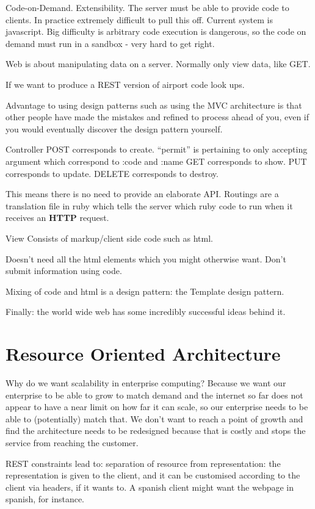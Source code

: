 \documentclass[11pt]{article}
\begin{document}
Code-on-Demand. Extensibility. The server must be able to provide code to clients. In practice extremely difficult to pull this off. Current system is javascript. Big difficulty is arbitrary code execution is dangerous, so the code on demand must run in a sandbox - very hard to get right.

Web is about manipulating data on a server. Normally only view data, like GET.

If we want to produce a REST version of airport code look ups.

Advantage to using design patterns such as using the MVC architecture is that other people have made the mistakes and refined to process ahead of you, even if you would eventually discover the design pattern yourself.

Controller
POST corresponds to create. ``permit'' is pertaining to only accepting argument which correspond to :code and :name
GET corresponds to show.
PUT corresponds to update.
DELETE corresponds to destroy.

This means there is no need to provide an elaborate API. Routings are a translation file in ruby which tells the server which ruby code to run when it receives an \textbf{HTTP} request.

View
Consists of markup/client side code such as html.

Doesn't need all the html elements which you might otherwise want.
Don't submit information using code.

Mixing of code and html is a design pattern: the Template design pattern.

Finally: the world wide web has some incredibly successful ideas behind it.

\section{Resource Oriented Architecture}

Why do we want scalability in enterprise computing? Because we want our enterprise to be able to grow to match demand and the internet so far does not appear to have a near limit on how far it can scale, so our enterprise needs to be able to (potentially) match that. We don’t want to reach a point of growth and find the architecture needs to be redesigned because that is costly and stops the service from reaching the customer.

REST constraints lead to:
separation of resource from representation: the representation is given to the client, and it can be customised according to the client via headers, if it wants to. A spanish client might want the webpage in spanish, for instance.
\end{document}
